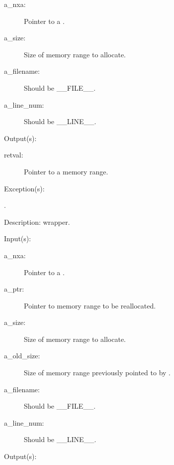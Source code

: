 \begin{capi}
\begin{capilist}
\begin{description}
		\item[a\_nxa: ]
			Pointer to a .
		\item[a\_size: ]
			Size of memory range to allocate.
		\item[a\_filename: ]
			Should be \_\_FILE\_\_.
		\item[a\_line\_num: ]
			Should be \_\_LINE\_\_.
		\end{description}
	\item[Output(s): ]
		\begin{description}\item[]
		\item[retval: ]
			Pointer to a memory range.
		\end{description}
	\item[Exception(s): ]
		\begin{description}\item[]
		\item[.]
		\end{description}
	\item[Description: ]
		 wrapper.
	\end{capilist}
\label{nxa_malloc_e}
\label{nxa_malloc}
	\begin{capilist}
	\item[Input(s): ]
		\begin{description}\item[]
		\item[a\_nxa: ]
			Pointer to a .
		\item[a\_ptr: ]
			Pointer to memory range to be reallocated.
		\item[a\_size: ]
			Size of memory range to allocate.
		\item[a\_old\_size: ]
			Size of memory range previously pointed to by
			.
		\item[a\_filename: ]
			Should be \_\_FILE\_\_.
		\item[a\_line\_num: ]
			Should be \_\_LINE\_\_.
		\end{description}
	\item[Output(s): ]
		\begin{description}\item[]

\end{description}
\end{capilist}
\end{capi}
